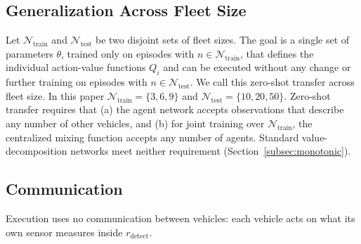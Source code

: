 \subsection{Generalization Across Fleet Size}
\label{subsec:generalization}
Let $\mathcal{N}_{\text{train}}$ and $\mathcal{N}_{\text{test}}$ be two disjoint sets of fleet
sizes. The goal is a single set of parameters $\theta$, trained only on episodes with
$n\in\mathcal{N}_{\text{train}}$, that defines the individual action-value functions $Q_i$
and can be executed without any change or further training on episodes with
$n\in\mathcal{N}_{\text{test}}$. We call this zero-shot transfer across fleet size. In this
paper $\mathcal{N}_{\text{train}}=\{3,6,9\}$ and $\mathcal{N}_{\text{test}}=\{10,20,50\}$.
Zero-shot transfer requires that (a) the agent network accepts observations that describe
any number of other vehicles, and (b) for joint training over $\mathcal{N}_{\text{train}}$,
the centralized mixing function accepts any number of agents. Standard value-decomposition
networks meet neither requirement (Section~\ref{subsec:monotonic}).

\subsection{Communication}
\label{subsec:communication}
Execution uses no communication between vehicles: each vehicle acts on what its own sensor
measures inside $r_{\text{detect}}$.
